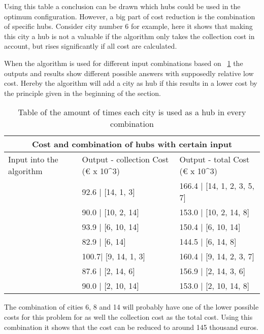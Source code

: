 \documentclass{article}
\begin{document}
Using this table a conclusion can be drawn which hubs could be used in the optimum configuration. However, a big part of cost reduction is the combination of specific hubs. Consider city number 6 for example, here it shows that making this city a hub is not a valuable if the algorithm only takes the collection cost in account, but rises significantly if all cost are calculated. 

When the algorithm is used for different input combinations based on ~\ref{amount of times hubs are used in collection} the outputs and results show different possible answers with supposedly relative low cost. Hereby the algorithm will add a city as hub if this results in a lower cost by the principle given in the beginning of the section. 

\begin{table}
\begin{tabular}{ |p{3cm}|p{3cm}|p{4cm}|}
\hline
\multicolumn{3}{|c|}{Cost and combination of hubs with certain input} \\
\hline
Input into the algorithm & Output -  collection Cost (€ x 10^3) & Output - total Cost (€ x 10^3)\\
\hline
[14] &  92.6 | [14, 1, 3] & 166.4 | [14, 1, 2, 3, 5, 7]  \\
\hline
[10] & 90.0 | [10, 2, 14]   & 153.0 | [10, 2, 14, 8] \\
\hline
[6, 10]& 93.9 | [6, 10, 14] & 150.4 |  [6, 10, 14]\\
\hline
[6, 14] &  82.9 | [6, 14]  &  144.5 | [6, 14, 8] \\
\hline
[9, 14] &  100.7| [9, 14, 1, 3] & 160.4 |  [9, 14, 2, 3, 7] \\
\hline
[2, 14] & 87.6 | [2, 14, 6] & 156.9 |  [2, 14, 3, 6]\\
\hline
[2, 10, 14] & 90.0 | [2, 10, 14] & 153.0 | [2, 10, 14, 8]  \\
\hline
\end{tabular}
\caption{Table of the amount of times each city is used as a hub in every combination}
\label{amount of times hubs are used in collection} 
\end{table}

The combination of cities 6, 8 and 14 will probably have one of the lower possible costs for this problem for as well the collection cost as the total cost. Using this combination it shows that the cost can be reduced to around 145 thousand euros. 
\end{document}
